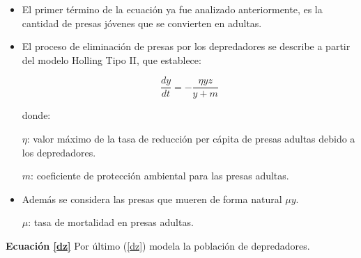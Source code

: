 \documentclass{wscpaperproc}
\theoremstyle{wsc}
\begin{document}
\begin{itemize}
	\item El primer término de la ecuación ya fue analizado anteriormente, es la cantidad de presas jóvenes que se convierten en adultas.

	\item El proceso de eliminación de presas por los depredadores se describe a partir del modelo Holling Tipo II, que establece:

	      $$\frac{dy}{dt} = -\frac{\eta yz}{y+m}$$

	      donde:

	      $\eta$: valor máximo de la tasa de reducción per cápita de presas adultas debido a los depredadores.

	      $m$: coeficiente de protección ambiental para las presas adultas.

	\item Además se considera las presas que mueren de forma natural $\mu y$.

	      $\mu$: tasa de mortalidad en presas adultas.
\end{itemize}

\vspace*{1cm}
{\bf Ecuación \ref*{dz}}
Por último (\ref*{dz}) modela la población de depredadores.
\end{document}
